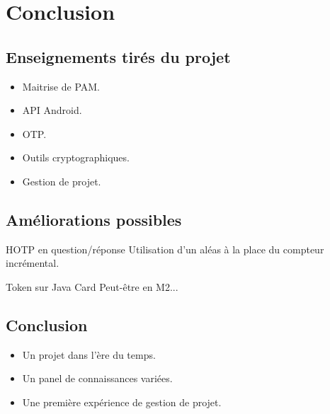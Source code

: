 \chapter{Conclusion}

\section{Enseignements tirés du projet}
\begin{itemize}
\item Maitrise de PAM.
\item API Android.
\item OTP.
\item Outils cryptographiques.
\item Gestion de projet.
\end{itemize}




\section{Améliorations possibles}
HOTP en question/réponse
Utilisation d'un aléas à la place du compteur incrémental.

Token sur Java Card
Peut-être en M2...



\section{Conclusion}

\begin{itemize}
\item Un projet dans l'ère du temps.
\item Un panel de connaissances variées.
\item Une première expérience de gestion de projet.
\end{itemize}
